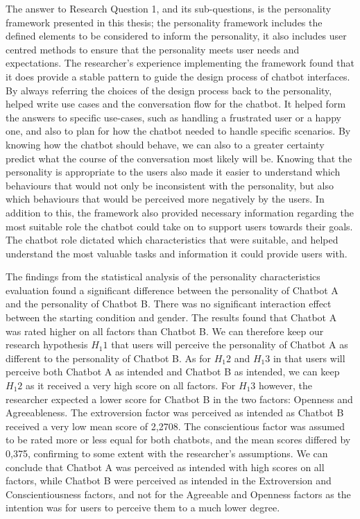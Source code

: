 The answer to Research Question 1, and its sub-questions, is the personality framework presented in this thesis; the personality framework includes the defined elements to be considered to inform the personality, it also includes user centred methods to ensure that the personality meets user needs and expectations. The researcher's experience implementing the framework found that it does provide a stable pattern to guide the design process of chatbot interfaces. By always referring the choices of the design process back to the personality, helped write use cases and the conversation flow for the chatbot. It helped form the answers to specific use-cases, such as handling a frustrated user or a happy one, and also to plan for how the chatbot needed to handle specific scenarios. By knowing how the chatbot should behave, we can also to a greater certainty predict what the course of the conversation most likely will be. Knowing that the personality is appropriate to the users also made it easier to understand which behaviours that would not only be inconsistent with the personality, but also which behaviours that would be perceived more negatively by the users. In addition to this, the framework also provided necessary information regarding the most suitable role the chatbot could take on to support users towards their goals. The chatbot role dictated which characteristics that were suitable, and helped understand the most valuable tasks and information it could provide users with.

The findings from the statistical analysis of the personality characteristics evaluation found a significant difference between the personality of Chatbot A and the personality of Chatbot B. There was no significant interaction effect between the starting condition and gender. The results found that Chatbot A was rated higher on all factors than Chatbot B. We can therefore keep our research hypothesis $H_1 1$ that users will perceive the personality of Chatbot A as different to the personality of Chatbot B. As for $H_1 2$ and $H_1 3$ in that users will perceive both Chatbot A as intended and Chatbot B as intended, we can keep $H_1 2$ as it received a very high score on all factors. For $H_1 3$ however, the researcher expected a lower score for Chatbot B in the two factors: Openness and Agreeableness. The extroversion factor was perceived as intended as Chatbot B received a very low mean score of 2,2708. The conscientious factor was assumed to be rated more or less equal for both chatbots, and the mean scores differed by 0,375, confirming to some extent with the researcher's assumptions. We can conclude that Chatbot A was perceived as intended with high scores on all factors, while Chatbot B were perceived as intended in the Extroversion and Conscientiousness factors, and not for the Agreeable and Openness factors as the intention was for users to perceive them to a much lower degree. 

